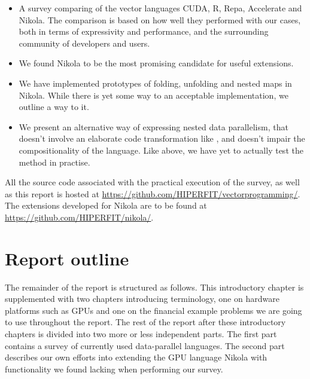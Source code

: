 \begin{itemize}

\item A survey comparing of the vector languages CUDA, R, Repa, Accelerate and
  Nikola. The comparison is based on how well they performed with our cases,
  both in terms of expressivity and performance, and the surrounding community
  of developers and users.

\item We found Nikola to be the most promising candidate for useful extensions.

\item We have implemented prototypes of folding, unfolding and nested maps in
  Nikola. While there is yet some way to an acceptable implementation, we
  outline a way to it.

\item We present an alternative way of expressing nested data parallelism, that
  doesn't involve an elaborate code transformation like \cite{nesl}, and
  doesn't impair the compositionality of the language. Like above, we have yet
  to actually test the method in practise.

\end{itemize}

%
%

All the source code associated with the practical execution of the survey, as well as this report is hosted at
\url{https://github.com/HIPERFIT/vectorprogramming/}.
The extensions developed for Nikola are to be found at \url{https://github.com/HIPERFIT/nikola/}.

\section{Report outline}
The remainder of the report is structured as follows. This
introductory chapter is supplemented with two chapters introducing
terminology, one on hardware platforms such as GPUs and one on the
financial example problems we are going to use throughout the
report. The rest of the report after these introductory chapters is
divided into two more or less independent parts. The first part
contains a survey of currently used data-parallel languages. The
second part describes our own efforts into extending the GPU language
Nikola with functionality we found lacking when performing our survey.


